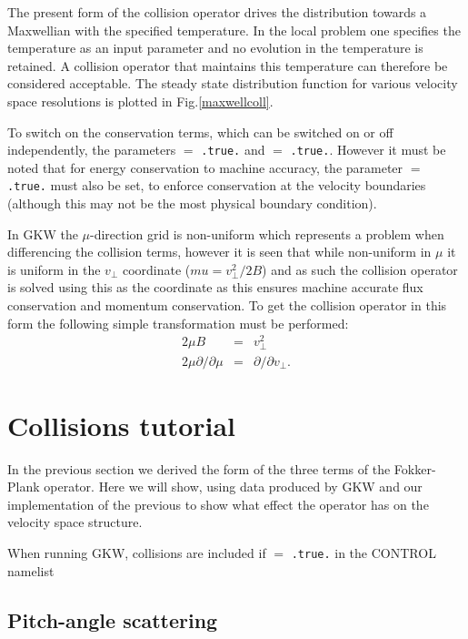 The present form of the collision operator drives the distribution 
towards a Maxwellian with the specified temperature. In the local problem one specifies the temperature as an input 
parameter and no evolution in the temperature is retained. A collision operator that maintains this temperature can therefore 
be considered acceptable.  The steady state distribution function for various velocity space resolutions is plotted in Fig.\ref{maxwellcoll}.

To switch on the conservation terms, which can be switched on or off independently, the parameters
  $=$  \texttt{.true.} and  $=$  \texttt{.true.}.  However it must be noted that for energy conservation to machine accuracy, the parameter  $=$  \texttt{.true.} must also be set, to enforce conservation at the velocity boundaries (although this may not be the most physical boundary condition).

In GKW the $\mu$-direction grid is non-uniform which represents a problem when differencing the collision terms, however it is
seen that while non-uniform in $\mu$ it is uniform in the $v_{\perp}$ coordinate ($mu = v_{\perp}^2/2B$) and as such the collision operator 
is solved using this as the coordinate as this ensures machine accurate flux conservation and momentum conservation.  To get the collision operator
in this form the following simple transformation must be performed:
\begin{eqnarray}
2{\mu}B &=& v_{\perp}^{2}\\
2\mu\partial/\partial\mu &=& \partial/\partial{v_{\perp}}.
\end{eqnarray} 

\section{Collisions tutorial}

In the previous section we derived the form of the three terms of the Fokker-Plank operator.  
Here we will show, using data produced by GKW and our implementation of the previous to show what effect the operator has on the velocity space structure.

When running GKW, collisions are included if  $=$  \texttt{.true.} in the CONTROL namelist

\subsection{Pitch-angle scattering}

